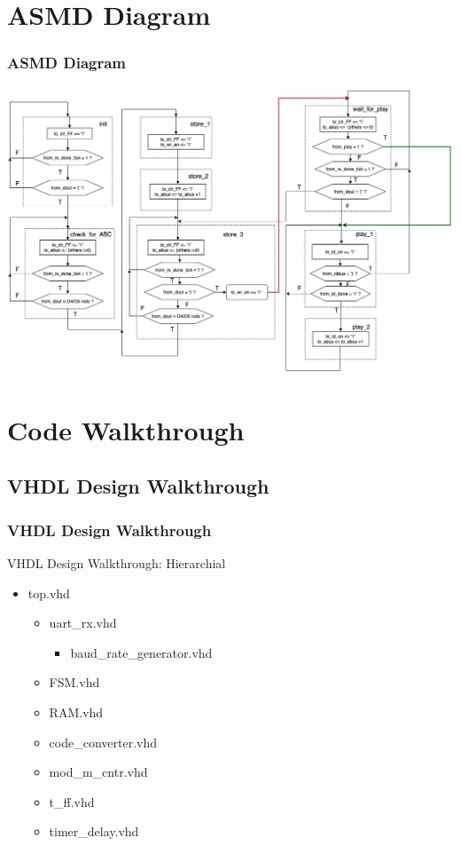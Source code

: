 \documentclass{beamer}
\begin{document}
\section{ASMD Diagram}
\begin{frame}
\frametitle{ASMD Diagram}
\includegraphics[width=\textwidth,height=0.8\textheight] {../diagram/ccw_music_player-asmd_chart.jpg}
\end{frame}

\section{Code Walkthrough}
\subsection{VHDL Design Walkthrough}
\begin{frame}
\frametitle{VHDL Design Walkthrough}
VHDL Design Walkthrough: Hierarchial 
\begin{itemize}

\item top.vhd
\begin {itemize}
\item uart\_rx.vhd
\begin {itemize}
\item baud\_rate\_generator.vhd
\end {itemize}
\item FSM.vhd
\item RAM.vhd
\item code\_converter.vhd
\item mod\_m\_cntr.vhd
\item t\_ff.vhd
\item timer\_delay.vhd
\end {itemize}
\end {itemize}
\end{frame}
\end{document}
